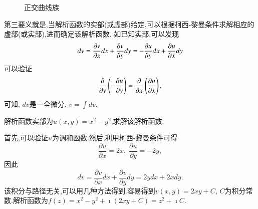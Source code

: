\begin{figure}
      \centering
        
        \caption{正交曲线族}
        \label{fig:orthogonal_level_curves}
\end{figure}

第三要义就是,当解析函数的实部(或虚部)给定,可以根据柯西-黎曼条件求解相应的虚部(或实部),进而确定该解析函数.
如已知实部,可以发现
\begin{equation}
    d v = \frac{\partial{v}}{\partial{x}} dx + \frac{\partial{v}}{\partial{y}} dy = -\frac{\partial{u}}{\partial{y}} dx + \frac{\partial{u}}{\partial{x}} dy
\end{equation}
可以验证 
$$
\frac{\partial{}}{\partial{y}} \left( - \frac{\partial{u}}{\partial{y}} \right) = \frac{\partial{}}{\partial{x}} \left( \frac{\partial{u}}{\partial{x}} \right) , 
$$
可知, $dv$是一全微分, $v = \int dv$.

\begin{example}
解析函数实部为$u(x,y) = x^2 - y^2$,求解该解析函数.
\end{example}
\begin{solution}
首先,可以验证$u$为调和函数.然后,利用柯西-黎曼条件可得
\begin{equation}
    \frac{\partial u}{\partial x } = 2x, \; \frac{\partial u}{\partial y } = -2y  ,
\end{equation}
因此
\begin{equation}
    d v = \frac{\partial v}{\partial x } dx + \frac{\partial v}{\partial y } dy = 2y dx + 2x dy .
\end{equation}
该积分与路径无关,可以用几种方法得到.容易得到$v(x,y) = 2xy + C$, $C$为积分常数.解析函数为$f(z)=x^2 - y^2 + \imath (2x y + C) = z^2 + \imath C$.
\end{solution}
    